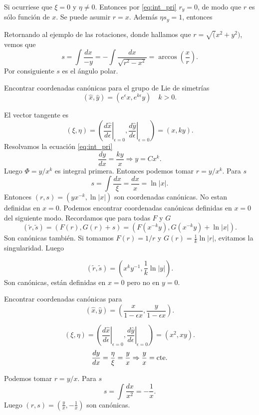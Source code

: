 Si ocurriese que $\xi=0$ y $\eta\neq 0$. Entonces por \eqref{eq:int_pri} $r_y=0$, de modo que $r$ es sólo función de $x$. Se puede asumir $r=x$. Además $\eta s_y=1$, entonces


\begin{ejemplo} Retornando al ejemplo de las rotaciones, donde hallamos que $r=\sqrt(x^2+y^2)$, vemos que
\[s=\int\frac{dx}{-y}=-\int\frac{dx}{\sqrt{r^2-x^2}}=\arccos\left(\frac{x}{r}\right).\]
Por consiguiente  $s$ es el ángulo polar.
\end{ejemplo}


\label{pag_ejem_canon1}
\begin{ejemplo} Encontrar coordenadas canónicas para el grupo de Lie de simetrías
\[(\hat{x},\hat{y})=(e^{\epsilon}x,e^{k\epsilon}y)\quad k>0.\]
\end{ejemplo}
El vector tangente es
\[(\xi,\eta)=\left(\left.\frac{d\hat{x}}{d\epsilon}\right|_{\epsilon=0},\left.\frac{d\hat{y}}{d\epsilon}\right|_{\epsilon=0}\right)=(x,ky).\]
Resolvamos la ecuación  \eqref{eq:int_pri} 
\[\frac{dy}{dx}=\frac{ky}{x}\Rightarrow y=Cx^k.\]
Luego $\Phi=y/x^k$ es integral primera. Entonces podemos tomar $r=y/x^k$.  Para $s$
\label{pag_ejem_canon2}
\[s=\int\frac{dx}{\xi}=\frac{dx}{x}=\ln|x|.\]
Entonces $(r,s)=(yx^{-k},\ln|x|)$ son coordenadas canónicas. No estan definidas en $x=0$.
Podemos encontrar coordenadas canónicas definidas en $x=0$ del siguiente modo. Recordamos que para todas $F$ y $G$
\[(\tilde{r},\tilde{s})=(F(r),G(r)+s)=(F(x^{-k}y),G(x^{-k}y)+\ln|x|).\]
Son canónicas también. Si tomamos $F(r)=1/r$ y $G(r)=\frac{1}{k}\ln|r|$, evitamos la singularidad. Luego

\[(\tilde{r},\tilde{s})=(x^ky^{-1},\frac{1}{k}\ln|y|).\]
Son canónicas, están definidas en $x=0$ pero no en $y=0$.  


\begin{ejemplo} Encontrar coordenadas canónicas para
\[(\hat{x},\hat{y})=\left( \frac{x}{1-\epsilon x},\frac{y}{1-\epsilon x}\right).\]
\end{ejemplo}

\[(\xi,\eta)=\left(\left.\frac{d\hat{x}}{d\epsilon}\right|_{\epsilon=0},\left.\frac{d\hat{y}}{d\epsilon}\right|_{\epsilon=0}\right)=(x^2,xy).\]
\label{pag:can_ejem_p}
\[\frac{dy}{dx}=\frac{\eta}{\xi}=\frac{y}{x}\Rightarrow \frac{y}{x}=\hbox{cte}.\]

Podemos tomar $r=y/x$. Para $s$
\[s=\int\frac{dx}{x^2}=-\frac{1}{x}.\]
Luego $(r,s)=(\frac{y}{x},-\frac{1}{x})$ son canónicas.

